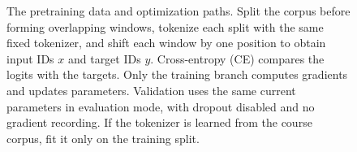 \begin{figure}[htbp]
\caption{The pretraining data and optimization paths. Split the corpus before
forming overlapping windows, tokenize each split with the same fixed tokenizer,
and shift each window by one position to obtain input IDs $x$ and target IDs $y$.
Cross-entropy (CE) compares the logits with the targets. Only the training branch
computes gradients and updates parameters. Validation uses the same current
parameters in evaluation mode, with dropout disabled and no gradient recording.
If the tokenizer is learned from the course corpus, fit it only on the training
split.}
\label{fig:pretraining-flow}
\end{figure}
